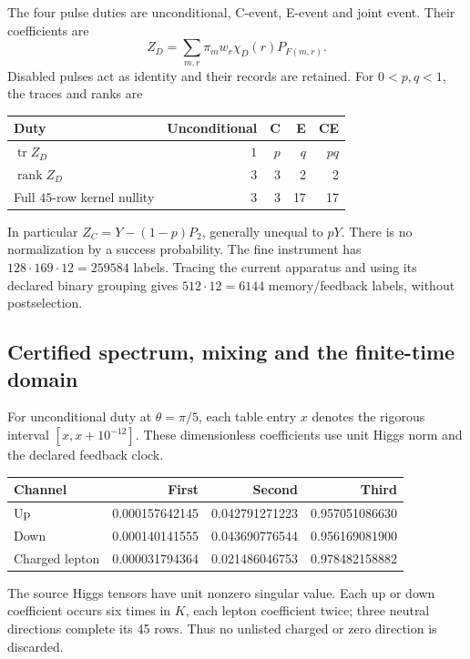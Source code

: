 The four pulse duties are unconditional, C-event, E-event and joint event.
Their coefficients are
\[
 Z_D=\sum_{m,r}\pi_m w_r\chi_D(r)P_{F(m,r)}.
\]
Disabled pulses act as identity and their records are retained.
For \(0<p,q<1\), the traces and ranks are
\begin{center}
\begin{tabular}{lrrrr}
\toprule
Duty & Unconditional & C & E & CE\\
\midrule
\(\operatorname{tr}Z_D\) & \(1\) & \(p\) & \(q\) & \(pq\)\\
\(\operatorname{rank}Z_D\) & 3 & 3 & 2 & 2\\
Full \(45\)-row kernel nullity & 3 & 3 & 17 & 17\\
\bottomrule
\end{tabular}
\end{center}
In particular \(Z_C=Y-(1-p)P_2\), generally unequal to \(pY\).
There is no normalization by a success probability. The fine instrument
has \(128\cdot169\cdot12=259584\) labels. Tracing the current apparatus
and using its declared binary grouping gives \(512\cdot12=6144\)
memory/feedback labels, without postselection.

\subsection{Certified spectrum, mixing and the finite-time domain}
\label{subsec:source-flavor-spectrum}

For unconditional duty at \(\theta=\pi/5\), each table entry \(x\)
denotes the rigorous interval \([x,x+10^{-12}]\). These dimensionless
coefficients use unit Higgs norm and the declared feedback clock.
\begin{center}
\small
\begin{tabular}{lrrr}
\toprule
Channel & First & Second & Third\\
\midrule
Up & 0.000157642145 & 0.042791271223 & 0.957051086630\\
Down & 0.000140141555 & 0.043690776544 & 0.956169081900\\
Charged lepton & 0.000031794364 & 0.021486046753 & 0.978482158882\\
\bottomrule
\end{tabular}
\end{center}
The source Higgs tensors have unit nonzero singular value. Each up or
down coefficient occurs six times in \(K\), each lepton coefficient twice;
three neutral directions complete its 45 rows. Thus no unlisted charged
or zero direction is discarded.

